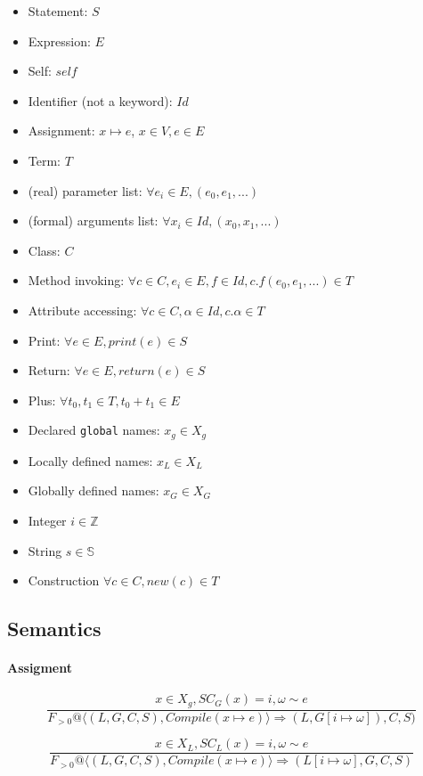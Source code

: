 \documentclass[]{article}
\numberwithin{equation}{section}
\numberwithin{figure}{section}
\numberwithin{table}{section}
\begin{document}
\begin{itemize}
\itemsep1pt\parskip0pt
\item
  Statement: $S$
\item
  Expression: $E$
\item
  Self: $self$
\item
  Identifier (not a keyword): $Id$
\item
  Assignment: $x \mapsto e$, $x \in V, e \in E$
\item
  Term: $T$
\item
  (real) parameter list: $\forall e_i \in E, (e_0, e_1, ...)$
\item
  (formal) arguments list: $\forall x_i \in Id, (x_0, x_1, ...)$
\item
  Class: $C$
\item
  Method invoking:
  $\forall c \in C, e_i \in E, f \in Id, c.f(e_0, e_1, ...) \in T$
\item
  Attribute accessing: $\forall c \in C, \alpha \in Id, c.\alpha \in T$
\item
  Print: $\forall e \in E, print(e) \in S$
\item
  Return: $\forall e \in E, return(e) \in S$
\item
  Plus: $\forall t_0, t_1 \in T, t_0 + t_1 \in E$
\item
  Declared \texttt{global} names: $x_g \in X_g$
\item
  Locally defined names: $x_L \in X_L$
\item
  Globally defined names: $x_G \in X_G$
\item
  Integer $i \in \mathbb Z$
\item
  String $s \in \mathbb S$
\item
  Construction $\forall c \in C, new(c) \in T$
\end{itemize}

\subsection{Semantics}\label{semantics}

\paragraph{Assigment}\label{assigment}

\[\frac{x \in X_g, SC_G(x) = i, \omega \sim e}
        {F_{>0}@\langle (L, G, C, S), Compile (x \mapsto e) \rangle \Rightarrow (L, G[i \mapsto \omega]), C, S)}\]

\[\frac{x \in X_L, SC_L(x) = i, \omega \sim e}
        {F_{>0}@\langle (L, G, C, S), Compile (x \mapsto e) \rangle \Rightarrow (L[i \mapsto \omega], G, C, S)}\]
\end{document}
